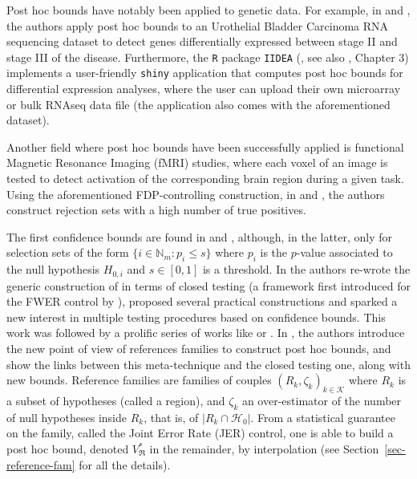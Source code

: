 \documentclass[
  11pt,
  a4paper,
]{article}
\theoremstyle{plain}
\theoremstyle{plain}
\theoremstyle{definition}
\theoremstyle{plain}
\theoremstyle{definition}
\theoremstyle{remark}
\begin{document}
Post hoc bounds have notably been applied to genetic data. For example,
in \citet{MR2951390} and \citet{10.1093/bioinformatics/btac693}, the
authors apply post hoc bounds to an Urothelial Bladder Carcinoma RNA
sequencing dataset to detect genes differentially expressed between
stage II and stage III of the disease. Furthermore, the \texttt{R}
\citep{R-base} package \texttt{IIDEA} (\citet{IIDEA}, see also
\citet{enjalbertcourrech:tel-05034928}, Chapter 3) implements a
user-friendly \texttt{shiny} application \citep{shiny} that computes
post hoc bounds for differential expression analyses, where the user can
upload their own microarray or bulk RNAseq data file (the application
also comes with the aforementioned dataset).

Another field where post hoc bounds have been successfully applied is
functional Magnetic Resonance Imaging (fMRI) studies, where each voxel
of an image is tested to detect activation of the corresponding brain
region during a given task. Using the aforementioned FDP-controlling
construction, in \citet{blain22notip} and \citet{NEURIPS2023_f6712d51},
the authors construct rejection sets with a high number of true
positives.

The first confidence bounds are found in \citet{MR2279468} and
\citet{MR2279639}, although, in the latter, only for selection sets of
the form \(\{i\in\mathbb{N}_m: p_i\leq s\}\) where \(p_i\) is the
\(p\)-value associated to the null hypothesis \(H_{0,i}\) and
\(s\in[0,1]\) is a threshold. In \citet{MR2951390} the authors re-wrote
the generic construction of \citet{MR2279468} in terms of closed testing
(a framework first introduced for the FWER control by \citet{MR468056}),
proposed several practical constructions and sparked a new interest in
multiple testing procedures based on confidence bounds. This work was
followed by a prolific series of works like \citet{MR3305943} or
\citet{MR4731977}. In \citet{MR4124323}, the authors introduce the new
point of view of references families to construct post hoc bounds, and
show the links between this meta-technique and the closed testing one,
along with new bounds. Reference families are families of couples
\((R_k,\zeta_k)_{k\in\mathcal{K}}\) where \(R_k\) is a subset of
hypotheses (called a region), and \(\zeta_k\) an over-estimator of the
number of null hypotheses inside \(R_k\), that is, of
\(|R_k\cap\mathcal{H}_0|\). From a statistical guarantee on the family,
called the Joint Error Rate (JER) control, one is able to build a post
hoc bound, denoted \(V^*_{\mathfrak{R}}\) in the remainder, by
interpolation (see Section~\ref{sec-reference-fam} for all the details).
\end{document}
